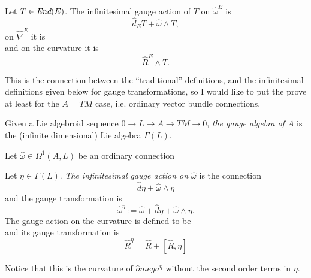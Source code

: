 {
\color{red}
\begin{proposition}
Let $T \in \operatorname{\textit{End}}(E)$. The infinitesimal gauge action of $T$ on $\hat \omega^E$ is
\begin{equation}
    \hat d_E T + \hat \omega \wedge T,
\end{equation}
on $\hat \nabla^E$ it is
\begin{equation}
    [\hat \nabla^E, T]
\end{equation}
and on the curvature it is
\begin{equation}
    \hat R^E \wedge T.
\end{equation}
\end{proposition}

This is the connection between the ``traditional'' definitions, and the infinitesimal definitions given below for gauge transformations, so I would like to put the prove at least for the $A = TM$ case, i.e. ordinary vector bundle connections.
}
\linea



\begin{definition}
Given a Lie algebroid sequence $0 \to L \to A \to TM \to 0$, \emph{the gauge algebra of $A$} is the (infinite dimensional) Lie algebra $\Gamma(L)$.
\end{definition}

Let $\hat \omega \in \Omega^1(A, L)$ be an ordinary connection

\begin{definition}
Let $\eta \in \Gamma(L)$. \emph{The infinitesimal gauge action on $\hat \omega$} is the connection
\begin{equation}
    \hat d \eta + \hat \omega \wedge \eta
\end{equation}
and the gauge transformation is
\begin{equation}
    \hat \omega^\eta := \hat \omega + \hat d \eta + \hat \omega \wedge \eta.
\end{equation}
The gauge action on the curvature is defined to be
\begin{equation}
    [\hat R, \eta]
\end{equation}
and its gauge transformation is
\begin{equation}
    \hat R^\eta = \hat R + [\hat R, \eta]
\end{equation}
\end{definition}

Notice that this is the curvature of $\hat omega^\eta$ without the second order terms in $\eta$.

